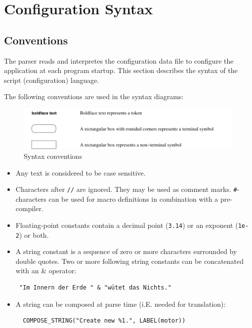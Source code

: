 \newpage
\section{Configuration Syntax}
\subsection{Conventions}
The parser reads and interpretes
the configuration data file to configure the \INTENS{} application
at each program startup.
This section describes the syntax of the \INTENS{} script (configuration) language.

The following conventions are used in the syntax diagrams:
\vspace{1cm}

\begin{figure}[h]\label{fig:syntaxConventions}
  \begin{center}
    \includegraphics[width=\linewidth]{xfig/sntx_conventions}
  \end{center}
  \caption{Syntax conventions}
\end{figure}
\vspace{1cm}

\begin{itemize}
\item
Any text is considered to be case sensitive.

\item
Characters after \verb+//+ are ignored. They may be
used as comment marks. 
\verb+#+-characters can be used for macro definitions
in combination with a pre-compiler.

\item
Floating-point 
constants contain a decimal point (\verb+3.14+) or an exponent (\verb+1e-2+) or both.

\item
A string constant 
is a sequence of zero or more characters surrounded by double
quotes.
 Two or more following string constants can be concatenated with an \& operator:
\begin{verbatim}
 "Im Innern der Erde " & "wütet das Nichts."
\end{verbatim}

\item
A string can be composed at parse time (i.E. needed for translation):
\begin{verbatim}
  COMPOSE_STRING("Create new %1.", LABEL(motor))
\end{verbatim}
\end{itemize}
